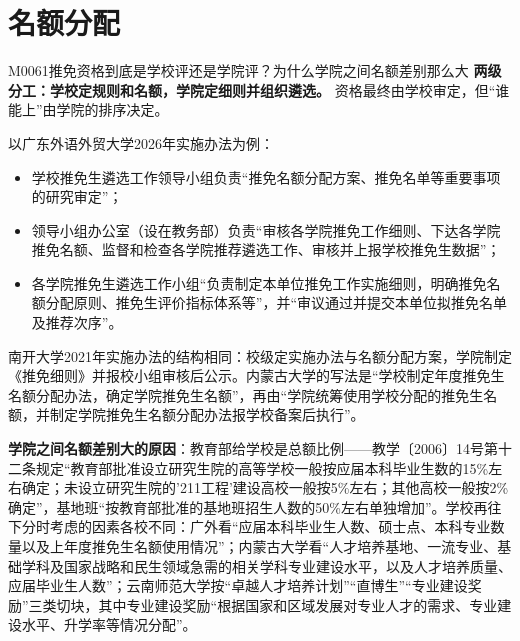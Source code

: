 \section{名额分配}
\begin{qa}{M0061}{推免资格到底是学校评还是学院评？为什么学院之间名额差别那么大}
\textbf{两级分工：学校定规则和名额，学院定细则并组织遴选。} 资格最终由学校审定，但“谁能上”由学院的排序决定。

以广东外语外贸大学2026年实施办法为例：
\begin{itemize}
  \item 学校推免生遴选工作领导小组负责“推免名额分配方案、推免名单等重要事项的研究审定”；
  \item 领导小组办公室（设在教务部）负责“审核各学院推免工作细则、下达各学院推免名额、监督和检查各学院推荐遴选工作、审核并上报学校推免生数据”；
  \item 各学院推免生遴选工作小组“负责制定本单位推免工作实施细则，明确推免名额分配原则、推免生评价指标体系等”，并“审议通过并提交本单位拟推免名单及推荐次序”。
\end{itemize}

南开大学2021年实施办法的结构相同：校级定实施办法与名额分配方案，学院制定《推免细则》并报校小组审核后公示。内蒙古大学的写法是“学校制定年度推免生名额分配办法，确定学院推免生名额”，再由“学院统筹使用学校分配的推免生名额，并制定学院推免生名额分配办法报学校备案后执行”。

\textbf{学院之间名额差别大的原因}：教育部给学校是总额比例——教学〔2006〕14号第十二条规定“教育部批准设立研究生院的高等学校一般按应届本科毕业生数的15\%左右确定；未设立研究生院的'211工程'建设高校一般按5\%左右；其他高校一般按2\%确定”，基地班“按教育部批准的基地班招生人数的50\%左右单独增加”。学校再往下分时考虑的因素各校不同：广外看“应届本科毕业生人数、硕士点、本科专业数量以及上年度推免生名额使用情况”；内蒙古大学看“人才培养基地、一流专业、基础学科及国家战略和民生领域急需的相关学科专业建设水平，以及人才培养质量、应届毕业生人数”；云南师范大学按“卓越人才培养计划”“直博生”“专业建设奖励”三类切块，其中专业建设奖励“根据国家和区域发展对专业人才的需求、专业建设水平、升学率等情况分配”。
\end{qa}

